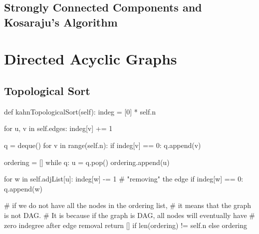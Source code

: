 \subsection{Strongly Connected Components and Kosaraju's Algorithm}

\section{Directed Acyclic Graphs}

\subsection{Topological Sort}

\begin{python}
    def kahnTopologicalSort(self):
        indeg = [0] * self.n

        for u, v in self.edges:
            indeg[v] += 1

        q = deque()
        for v in range(self.n):
            if indeg[v] == 0:
                q.append(v)

        ordering = []
        while q:
            u = q.pop()
            ordering.append(u)

            for w in self.adjList[u]:
                indeg[w] -= 1  # "removing" the edge
                if indeg[w] == 0:
                    q.append(w)

        # if we do not have all the nodes in the ordering list,
        # it means that the graph is not DAG.
        # It is because if the graph is DAG, all nodes will eventually have
        # zero indegree after edge removal
        return [] if len(ordering) != self.n else ordering
\end{python}
